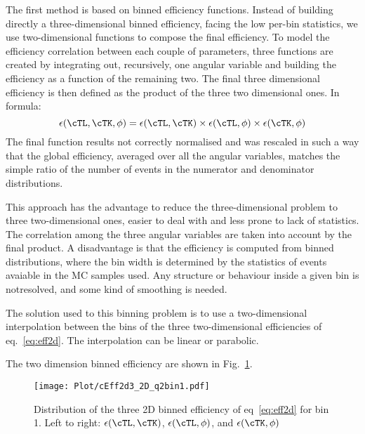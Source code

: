 The first method is based on binned efficiency functions.
Instead of building directly a three-dimensional binned efficiency, facing the low per-bin statistics, we use two-dimensional functions to compose the final efficiency.
To model the efficiency correlation between each couple of parameters, three functions are created by integrating out, recursively, one angular variable and building the efficiency as a function of the remaining two.
The final three dimensional efficiency is then defined as the product of the three two dimensional ones.
In formula:
\begin{equation}\label{eq:eff2d}
    \epsilon(\cTL,\cTK,\phi)=\epsilon(\cTL,\cTK)\times\epsilon(\cTL,\phi)\times\epsilon(\cTK,\phi)
\end{equation}
The final function results not correctly normalised and was rescaled in such a way that the global efficiency, averaged over all the angular variables, matches the simple ratio of the number of events in the numerator and denominator distributions.

This approach has the advantage to reduce the three-dimensional problem to three two-dimensional ones, easier to deal with and less prone to lack of statistics.
The correlation among the three angular variables are taken into account by the final product.
A disadvantage is that the efficiency is computed from binned distributions, where the bin width is determined by the statistics of events avaiable in the MC samples used.
Any structure or behaviour inside a given bin is notresolved, and some kind of smoothing is needed.

The solution used to this binning problem is to use a two-dimensional interpolation between the bins of the three two-dimensional efficiencies of eq.~\ref{eq:eff2d}.
The interpolation can be linear or parabolic.

The two dimension binned efficiency are shown in Fig.~\ref{fig:eff2D}.

\begin{figure}[hbt]
    \texttt{[image: Plot/cEff2d3\_2D\_q2bin1.pdf]}

    \caption{Distribution of the three 2D binned efficiency of
        eq~\ref{eq:eff2d} for bin 1. Left to right: $\epsilon(\cTL,\cTK)$,
        $\epsilon(\cTL,\phi)$, and $\epsilon(\cTK,\phi)$}
    \label{fig:eff2D}
\end{figure}

